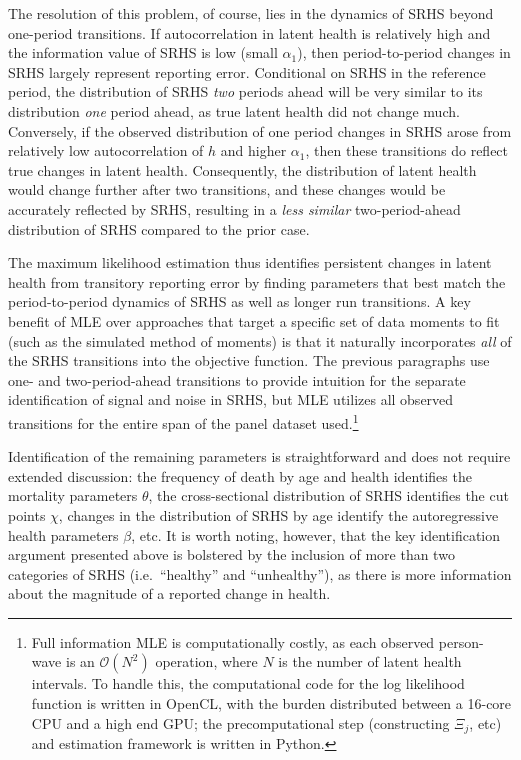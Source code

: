 \documentclass[12pt,pdftex,letterpaper]{article}
\newcommand{\Health}{h}
\newcommand{\Age}{j}
\newcommand{\Cut}{\chi}
\newcommand{\MortParam}{\theta}
\newcommand{\HealthParam}{\beta}
\newcommand{\LatentParam}{\alpha}
\newcommand{\TransPrb}{\Xi}
\begin{document}
The resolution of this problem, of course, lies in the dynamics of SRHS beyond one-period transitions.  If autocorrelation in latent health is relatively high and the information value of SRHS is low (small $\LatentParam_1$), then period-to-period changes in SRHS largely represent reporting error.  Conditional on SRHS in the reference period, the distribution of SRHS \textit{two} periods ahead will be very similar to its distribution \textit{one} period ahead, as true latent health did not change much.  Conversely, if the observed distribution of one period changes in SRHS arose from relatively low autocorrelation of $\Health$ and higher $\LatentParam_1$, then these transitions do reflect true changes in latent health.  Consequently, the distribution of latent health would change further after two transitions, and these changes would be accurately reflected by SRHS, resulting in a \textit{less similar} two-period-ahead distribution of SRHS compared to the prior case.

The maximum likelihood estimation thus identifies persistent changes in latent health from transitory reporting error by finding parameters that best match the period-to-period dynamics of SRHS as well as longer run transitions.  A key benefit of MLE over approaches that target a specific set of data moments to fit (such as the simulated method of moments) is that it naturally incorporates \textit{all} of the SRHS transitions into the objective function.  The previous paragraphs use one- and two-period-ahead transitions to provide intuition for the separate identification of signal and noise in SRHS, but MLE utilizes all observed transitions for the entire span of the panel dataset used.\footnote{Full information MLE is computationally costly, as each observed person-wave is an $\mathcal{O}(N^2)$ operation, where $N$ is the number of latent health intervals.  To handle this, the computational code for the log likelihood function is written in OpenCL, with the burden distributed between a 16-core CPU and a high end GPU; the precomputational step (constructing $\TransPrb_\Age$, etc) and estimation framework is written in Python.}

Identification of the remaining parameters is straightforward and does not require extended discussion: the frequency of death by age and health identifies the mortality parameters $\MortParam$, the cross-sectional distribution of SRHS identifies the cut points $\Cut$, changes in the distribution of SRHS by age identify the autoregressive health parameters $\HealthParam$, etc.  It is worth noting, however, that the key identification argument presented above is bolstered by the inclusion of more than two categories of SRHS (i.e.\ ``healthy'' and ``unhealthy''), as there is more information about the magnitude of a reported change in health.
\end{document}
